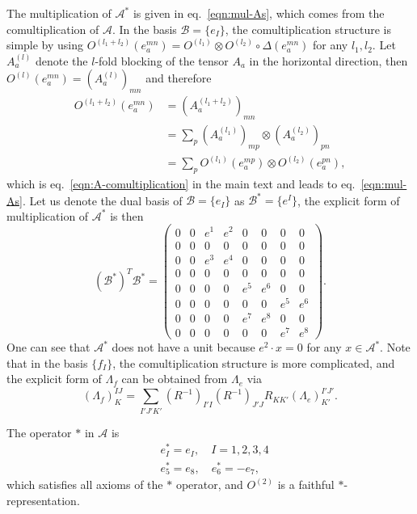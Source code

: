 \documentclass[prx, twocolumn, superscriptaddress, dvipsnames]{revtex4-2}
\theoremstyle{definition}
\newcommand{\mA}{\mathcal{A}}
\newcommand{\basis}{\mathcal{B}}
\begin{document}
The multiplication of $\mA^*$ is given in eq.~\eqref{eqn:mul-As}, which comes from the comultiplication of $\mA$. In the basis $\basis=\{e_I\}$, the comultiplication structure is simple by using $O^{(l_1+l_2)}(e_a^{mn})=O^{(l_1)}\otimes O^{(l_2)}\circ\Delta(e_a^{mn})$ for any $l_1,l_2$. Let $A^{(l)}_a$ denote the $l$-fold blocking of the tensor $A_a$ in the horizontal direction, then $O^{(l)}(e_a^{mn})=(A^{(l)}_a)_{mn}$ and therefore
\begin{equation}
\begin{aligned}
    O^{(l_1+l_2)}(e_a^{mn})&=(A^{(l_1+l_2)}_a)_{mn}\\&=\sum_p (A^{(l_1)}_a)_{mp}\otimes (A^{(l_2)}_a)_{pn}\\
    &=\sum_p  O^{(l_1)}(e_a^{mp})\otimes  O^{(l_2)}(e_a^{pn}),
\end{aligned}
\end{equation}
which is eq.~\eqref{eqn:A-comultiplication} in the main text and leads to eq.~\eqref{eqn:mul-As}. 
Let us denote the dual basis of $\basis=\{e_I\}$ as $\basis^*=\{e^I\}$, the explicit form of multiplication of $\mA^*$ is then
\begin{equation}
    (\basis^*)^T \basis^*=\begin{pmatrix}
        0 & 0 & e^1 & e^2 & 0 & 0 & 0 & 0\\
        0 & 0 & 0 & 0 & 0 & 0 & 0 & 0 \\
        0 & 0 & e^3 & e^4 & 0 & 0 & 0 & 0\\
        0 & 0 & 0 & 0 & 0 & 0 & 0 & 0 \\
        0 & 0 & 0 & 0 & e^5 & e^6 & 0 & 0 \\
        0 & 0 & 0 & 0 & 0 & 0 & e^5 & e^6 \\
        0 & 0 & 0 & 0 & e^7 & e^8 & 0 & 0 \\
        0 & 0 & 0 & 0 & 0 & 0 & e^7 & e^8
    \end{pmatrix}.
\end{equation}
One can see that $\mA^*$ does not have a unit because $e^2\cdot x=0$ for any $x\in \mA^*$. Note that in the basis $\{f_I\}$, the comultiplication structure is more complicated, and the explicit form of $\Lambda_f$ can be obtained from $\Lambda_e$ via
\begin{equation}
    (\Lambda_f)^{IJ}_K=\sum_{I'J'K'} (R^{-1})_{I' I} (R^{-1})_{J' J} R_{KK'} (\Lambda_e)^{I'J'}_{K'}.
\end{equation} 

The operator $*$ in $\mA$ is 
\begin{equation}
\begin{aligned}
    &e_I^* = e_I,\quad I=1,2,3,4\\
    &e_5^* = e_8,\quad e_6^*=-e_7,
\end{aligned}
\end{equation}
which satisfies all axioms of the $*$ operator, and $O^{(2)}$ is a faithful $*$-representation.  
\end{document}
